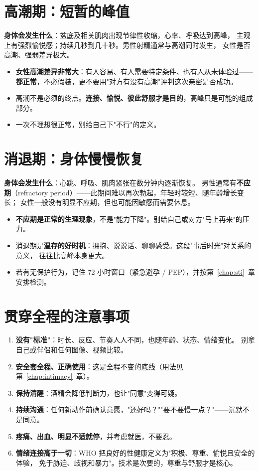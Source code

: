 \documentclass[12pt,UTF8,openany]{ctexbook}
\begin{document}
\section{高潮期：短暂的峰值}

\textbf{身体会发生什么}：盆底及相关肌肉出现节律性收缩，心率、呼吸达到高峰，
主观上有强烈愉悦感；持续几秒到几十秒。男性射精通常与高潮同时发生，
女性是否高潮、强弱差异极大。

\begin{itemize}[leftmargin=2em]
  \item \textbf{女性高潮差异非常大}：有人容易、有人需要特定条件、也有人从未体验过——
        \textbf{都正常}，不必假装，更不要用"对方有没有高潮"评判这次亲密是否成功。
  \item 高潮不是必须的终点。\textbf{连接、愉悦、彼此舒服才是目的}，高峰只是可能的组成部分。
  \item 一次不理想很正常，别给自己下"不行"的定义。
\end{itemize}

\section{消退期：身体慢慢恢复}

\textbf{身体会发生什么}：心跳、呼吸、肌肉紧张在数分钟内逐渐恢复。
男性通常有\textbf{不应期}（refractory period）——此期间难以再次勃起，年轻时较短、随年龄增长变长；
女性一般没有明显不应期，但也可能因敏感而需要休息。

\begin{itemize}[leftmargin=2em]
  \item \textbf{不应期是正常的生理现象}，不是"能力下降"。别给自己或对方"马上再来"的压力。
  \item 消退期是\textbf{温存的好时机}：拥抱、说说话、聊聊感受。这段"事后时光"对关系的意义，
        往往比高峰本身更大。
  \item 若有无保护行为，记住 72 小时窗口（紧急避孕 / PEP），并按第~\ref{chap:sti}~章安排检测。
\end{itemize}

\section{贯穿全程的注意事项}

\begin{enumerate}[leftmargin=2em,itemsep=0.3em]
  \item \textbf{没有"标准"}：时长、反应、节奏人人不同，也随年龄、状态、情绪变化。
        别拿自己或伴侣和任何图像、视频比较。
  \item \textbf{安全套全程、正确使用}：这是全程不变的底线（用法见第~\ref{chap:intimacy}~章）。
  \item \textbf{保持清醒}：酒精会降低判断力，也让"同意"变得可疑。
  \item \textbf{持续沟通}：任何新动作前确认意愿，"还好吗？""要不要慢一点？"——沉默不是同意。
  \item \textbf{疼痛、出血、明显不适就停}，并考虑就医，不要忍。
  \item \textbf{情绪连接高于一切}：WHO 把良好的性健康定义为"积极、尊重、愉悦且安全的体验，
        免于胁迫、歧视和暴力"。技术是次要的，尊重与舒服才是核心。
\end{enumerate}
\end{document}
